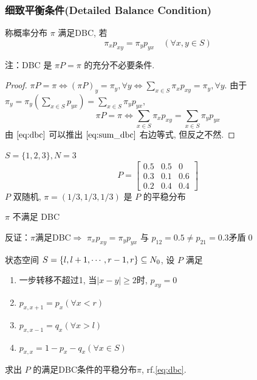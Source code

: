 \subsubsection{细致平衡条件(Detailed Balance Condition)}

\begin{definition}
    称概率分布 $\pi$ 满足DBC, 若
    \begin{equation}
        \pi_xp_{xy}=\pi_y p_{yx}\quad (\forall x,y\in S)
    \label{eq:dbc}
    \end{equation}
\end{definition}

注：DBC 是 $\pi P=\pi$ 的充分不必要条件.
\begin{proof}
$\pi P=\pi\iff (\pi P)_y=\pi_y,\forall y\iff\sum_{x\in S}\pi_x p_{xy}=\pi_y,\forall y$. 由于 $\pi_y=\pi_y(\sum_{x\in S} p_{yx})=\sum_{x\in S}\pi_y p_{yx}$,
\begin{equation}
    \pi P=\pi\iff\sum_{x\in S}\pi_x p_{xy}=\sum_{x\in S}\pi_y p_{yx}
    \label{eq:sum_dbc}
\end{equation}
由 $\eqref{eq:dbc}$ 可以推出 $\eqref{eq:sum_dbc}$ 右边等式, 但反之不然.
\end{proof}

\begin{example}[DBC反例]
    $S=\{1,2,3\},N=3$
    \[
    P=\begin{bmatrix}
        0.5 & 0.5 & 0\\
        0.3 & 0.1 & 0.6\\
        0.2 & 0.4 & 0.4
    \end{bmatrix}
    \]
    $P$ 双随机, $\pi=(1/3,1/3,1/3)$ 是 $P$ 的平稳分布
    \begin{claim}
        $\pi$ 不满足 DBC
    \end{claim}
    反证：$\pi$满足DBC$\Rightarrow$ $\pi_x p_{xy}=\pi_y p_{yx}$ 与 $p_{12}=0.5\neq p_{21}=0.3$矛盾\qed
\end{example}

\begin{example}[生灭链]\label{exa:birth_death}
    状态空间 $S=\{l,l+1,\cdots,r-1,r\}\subseteq N_0$, 设 $P$ 满足
    \begin{enumerate}
        \item 一步转移不超过1, 当$|x-y|\geq 2$时, $p_{xy}=0$
        \item $p_{x,x+1}=p_x(\forall x<r)$
        \item $p_{x,x-1}=q_x(\forall x>l)$
        \item $p_{x,x}=1-p_x-q_x(\forall x\in S)$
    \end{enumerate}
    求出 $P$ 的满足DBC条件的平稳分布$\pi$, rf.\eqref{eq:dbc}.
\end{example}

